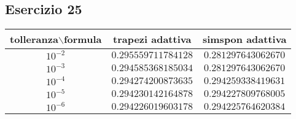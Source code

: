 \subsection{Esercizio 25}
\begin{tabular}{|c c c |}
        \hline
        tolleranza$\backslash$formula & trapezi adattiva          &simspon adattiva\\
        \hline
        $10^{-2}$                     &$0.295559711784128$        &$0.281297643062670$ \\
        \hline
        $10^{-3}$                     &$0.294585368185034$        &$0.281297643062670$ \\
        \hline
        $10^{-4}$                     &$0.294274200873635$        &$0.294259338419631$ \\
        \hline
        $10^{-5}$                     &$0.294230142164878$        &$0.294227809768005$ \\
        \hline
        $10^{-6}$                     &$0.294226019603178$        &$0.294225764620384$ \\
        \hline
    \end{tabular}

